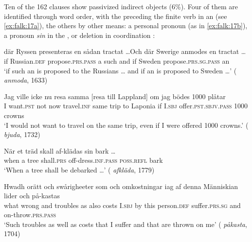 \documentclass[output=paper]{langscibook}
\begin{document}
Ten of the 162 clauses show passivized indirect objects (6\%). Four of them are identified through word order, with the  preceding the finite verb in an  (see \ref{ex:falk:17a}), the others by other means: a personal pronoun (as in \ref{ex:falk:17b}), a   pronoun \textit{sin} in the  , or deletion in coordination :


\ea%
    \label{ex:falk:17}
\ea\label{ex:falk:17a}
\gll där  Ryssen      presenteras       en  sådan  tractat …Och    där    Swerige  anmodes            en  tractat …\\
if    Russian\textsc{.def}  propose\textsc{.prs}.\textsc{pass}    a  such         and    if         Sweden  propose\textsc{.prs}.\textsc{sg}.\textsc{pass}  an  \\
\glt ‘if such an  is proposed to the Russians … and if an  is         proposed to Sweden …’ {( \textit{anmoda}, 1633)}

\ex\label{ex:falk:17b}
\gll Jag  ville      icke  nu    resa      samma [resa till Lappland] om  jag  bödes           1000  plåtar\\
I    want.\textsc{pst}  not  now  travel\textsc{.inf}  same     trip to Laponia  if  I.\textsc{sbj}   offer.\textsc{pst.sbjv}.\textsc{pass}  1000  crowns\\
\glt ‘I would not want to travel on the same trip, even if I were offered 1000 crowns.’ ( \textit{bjuda}, 1732)

\ex\label{ex:falk:17c}
\gll När  et  träd  skall        af-klädas          sin        bark … \\
      when  a  tree  shall.\textsc{prs}  off-dress\textsc{.inf}.\textsc{pass}  \textsc{poss}.\textsc{refl}    bark\\
\glt ‘When a tree shall be debarked …’ ( \textit{afkläda}, 1779)

\ex\label{ex:falk:17d}
\gll Hwadh  orätt    och  swårigheeter  som  och  omkostningar  iag    af  denna Människian    lider          och  på-kastas\\
what    wrong  and  troubles       as     also  costs          I.\textsc{sbj}  by  this            person.\textsc{def}    suffer.\textsc{prs.sg}    and  on-throw.\textsc{prs}.\textsc{pass}\\
\glt ‘Such troubles as well as costs that I suffer and that are thrown on   me’ {( \textit{påkasta}, 1704)}
\z
\z
\end{document}
